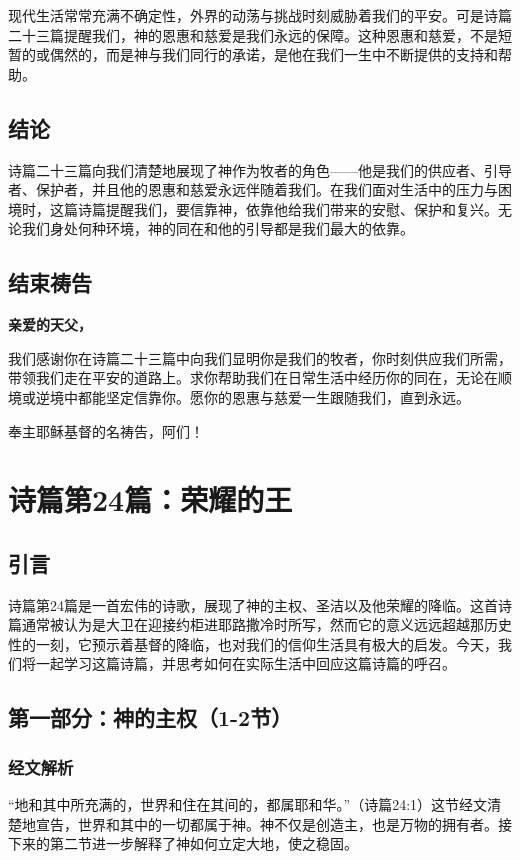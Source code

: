 \documentclass[a4paper, 12pt]{article}
\begin{document}
现代生活常常充满不确定性，外界的动荡与挑战时刻威胁着我们的平安。可是诗篇二十三篇提醒我们，神的恩惠和慈爱是我们永远的保障。这种恩惠和慈爱，不是短暂的或偶然的，而是神与我们同行的承诺，是他在我们一生中不断提供的支持和帮助。
\subsection*{结论}
\hspace{0.6cm}诗篇二十三篇向我们清楚地展现了神作为牧者的角色——他是我们的供应者、引导者、保护者，并且他的恩惠和慈爱永远伴随着我们。在我们面对生活中的压力与困境时，这篇诗篇提醒我们，要信靠神，依靠他给我们带来的安慰、保护和复兴。无论我们身处何种环境，神的同在和他的引导都是我们最大的依靠。

\subsection*{结束祷告}

\textbf{亲爱的天父，}

我们感谢你在诗篇二十三篇中向我们显明你是我们的牧者，你时刻供应我们所需，带领我们走在平安的道路上。求你帮助我们在日常生活中经历你的同在，无论在顺境或逆境中都能坚定信靠你。愿你的恩惠与慈爱一生跟随我们，直到永远。

奉主耶稣基督的名祷告，阿们！
\newpage
\section{诗篇第24篇：荣耀的王}

\subsection*{引言}
诗篇第24篇是一首宏伟的诗歌，展现了神的主权、圣洁以及他荣耀的降临。这首诗篇通常被认为是大卫在迎接约柜进耶路撒冷时所写，然而它的意义远远超越那历史性的一刻，它预示着基督的降临，也对我们的信仰生活具有极大的启发。今天，我们将一起学习这篇诗篇，并思考如何在实际生活中回应这篇诗篇的呼召。

\subsection*{第一部分：神的主权（1-2节）}
\subsubsection*{经文解析}
“地和其中所充满的，世界和住在其间的，都属耶和华。”（诗篇24:1）这节经文清楚地宣告，世界和其中的一切都属于神。神不仅是创造主，也是万物的拥有者。接下来的第二节进一步解释了神如何立定大地，使之稳固。
\end{document}
